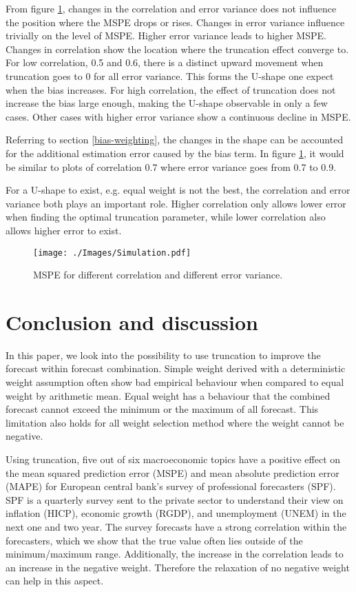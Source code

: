 \documentclass[11pt]{article}
\begin{document}
From figure \ref{fig: simulation}, changes in the correlation and error variance does not influence the position where the MSPE drops or rises. Changes in error variance influence trivially on the level of MSPE. Higher error variance leads to higher MSPE. Changes in correlation show the location where the truncation effect converge to. For low correlation, 0.5 and 0.6, there is a distinct upward movement when truncation goes to 0 for all error variance. This forms the U-shape one expect when the bias increases. For high correlation, the effect of truncation does not increase the bias large enough, making the U-shape observable in only a few cases. Other cases with higher error variance show a continuous decline in MSPE. 

Referring to section \ref{bias-weighting}, the changes in the shape can be accounted for the additional estimation error caused by the bias term. In figure \ref{fig: simulation}, it would be similar to plots of correlation 0.7 where error variance goes from 0.7 to 0.9.

For a U-shape to exist, e.g. equal weight is not the best, the correlation and error variance both plays an important role. Higher correlation only allows lower error when finding the optimal truncation parameter, while lower correlation also allows higher error to exist.

\begin{figure}[!h]
	\centering
	\texttt{[image: ./Images/Simulation.pdf]}
	\caption{MSPE for different correlation and different error variance.}\label{fig: simulation}
\end{figure}

\section{Conclusion and discussion}\label{conclusion}
In this paper, we look into the possibility to use truncation to improve the forecast within forecast combination. Simple weight derived with a deterministic weight assumption often show bad empirical behaviour when compared to equal weight by arithmetic mean. Equal weight has a behaviour that the combined forecast cannot exceed the minimum or the maximum of all forecast. This limitation also holds for all weight selection method where the weight cannot be negative. 

Using truncation, five out of six macroeconomic topics have a positive effect on the mean squared prediction error (MSPE) and mean absolute prediction error (MAPE) for European central bank's survey of professional forecasters (SPF). SPF is a quarterly survey sent to the private sector to understand their view on inflation (HICP), economic growth (RGDP), and unemployment (UNEM) in the next one and two year. The survey forecasts have a strong correlation within the forecasters, which we show that the true value often lies outside of the minimum/maximum range. Additionally, the increase in the correlation leads to an increase in the negative weight. Therefore the relaxation of no negative weight can help in this aspect.
\end{document}
